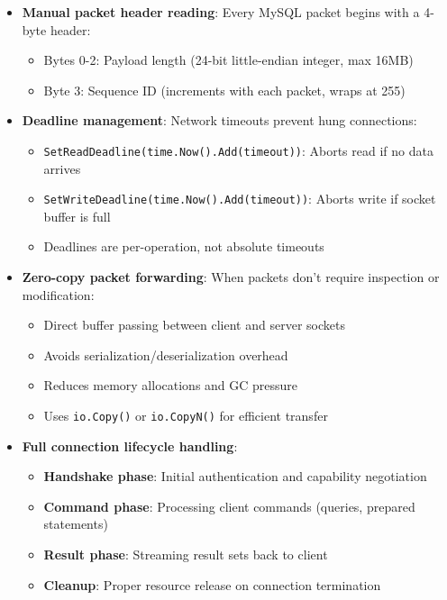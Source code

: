 \begin{itemize}
    \item \textbf{Manual packet header reading}: Every MySQL packet begins with a 4-byte header:
    \begin{itemize}
        \item Bytes 0-2: Payload length (24-bit little-endian integer, max 16MB)
        \item Byte 3: Sequence ID (increments with each packet, wraps at 255)
    \end{itemize}
    
    \item \textbf{Deadline management}: Network timeouts prevent hung connections:
    \begin{itemize}
        \item \texttt{SetReadDeadline(time.Now().Add(timeout))}: Aborts read if no data arrives
        \item \texttt{SetWriteDeadline(time.Now().Add(timeout))}: Aborts write if socket buffer is full
        \item Deadlines are per-operation, not absolute timeouts
    \end{itemize}
    
    \item \textbf{Zero-copy packet forwarding}: When packets don't require inspection or modification:
    \begin{itemize}
        \item Direct buffer passing between client and server sockets
        \item Avoids serialization/deserialization overhead
        \item Reduces memory allocations and GC pressure
        \item Uses \texttt{io.Copy()} or \texttt{io.CopyN()} for efficient transfer
    \end{itemize}
    
    \item \textbf{Full connection lifecycle handling}:
    \begin{itemize}
        \item \textbf{Handshake phase}: Initial authentication and capability negotiation
        \item \textbf{Command phase}: Processing client commands (queries, prepared statements)
        \item \textbf{Result phase}: Streaming result sets back to client
        \item \textbf{Cleanup}: Proper resource release on connection termination
    \end{itemize}
\end{itemize}

